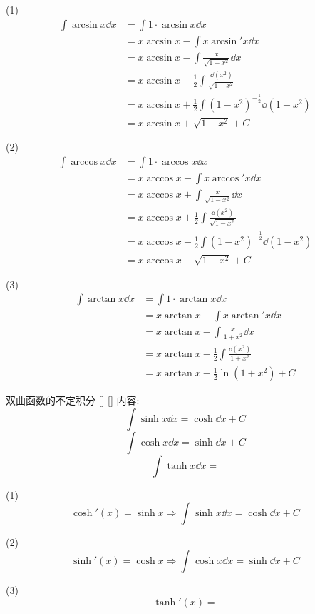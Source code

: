 \documentclass[UTF8]{ctexart}
\begin{document}
				\begin{prf}
					(1)
					\[\begin{aligned}
					\int \arcsin x \dd x 
					& = \int 1 \cdot \arcsin x \dd x \\
					& = x \arcsin x - \int x \arcsin' x \dd x \\
					& = x \arcsin x - \int \frac{x}{\sqrt{1 - x^2}} \dd x \\
					& = x \arcsin x - \frac{1}{2} \int \frac{\dd (x^2)}{\sqrt{1 - x^2}} \\
					& = x \arcsin x + \frac{1}{2} \int (1 - x^2)^{-\frac{1}{2}} \dd (1 - x^2) \\
					& = x \arcsin x + \sqrt{1 - x^2} + C
					\end{aligned}\]
					
					(2)
					\[\begin{aligned}
					\int \arccos x \dd x 
					& = \int 1 \cdot \arccos x \dd x \\
					& = x \arccos x - \int x \arccos' x \dd x \\
					& = x \arccos x + \int \frac{x}{\sqrt{1 - x^2}} \dd x \\
					& = x \arccos x + \frac{1}{2} \int \frac{\dd (x^2)}{\sqrt{1 - x^2}} \\
					& = x \arccos x - \frac{1}{2} \int (1 - x^2)^{-\frac{1}{2}} \dd (1 - x^2) \\
					& = x \arccos x - \sqrt{1 - x^2} + C
					\end{aligned}\]
					
					(3)
					\[\begin{aligned}
					\int \arctan x \dd x 
					& = \int 1 \cdot \arctan x \dd x \\
					& = x \arctan x - \int x \arctan' x \dd x \\
					& = x \arctan x - \int \frac{x}{1 + x^2} \dd x \\
					& = x \arctan x - \frac{1}{2} \int \frac{\dd (x^2)}{1 + x^2} \\
					& = x \arctan x - \frac{1}{2} \ln(1 + x^2) + C
					\end{aligned}\]
				\end{prf}
			
			\begin{xmp}
			    []
			    {双曲函数的不定积分}
			    []
			    []
				内容: 
				\[\int\sinh x\dd x=\cosh\dd x+C\]
				\[\int\cosh x\dd x=\sinh\dd x+C\]
				\[\int\tanh x\dd x=\]
			\end{xmp}
			
			\begin{prf}
				
				(1)\[\cosh'(x)=\sinh x\Longrightarrow\int\sinh x\dd x=\cosh\dd x+C\]
				
				(2)\[\sinh'(x)=\cosh x\Longrightarrow\int\cosh x\dd x=\sinh\dd x+C\]
				
				(3)\[\tanh'(x)=\]

                \end{prf}
				
\end{document}
